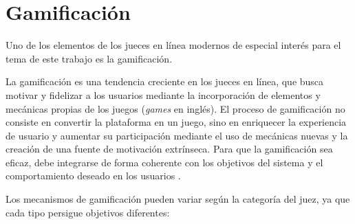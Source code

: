 \section{Gamificación}

Uno de los elementos de los jueces en línea modernos de especial interés para el tema de este trabajo es la gamificación. 

La gamificación es una tendencia creciente en los jueces en línea, que busca motivar y fidelizar a los usuarios mediante la incorporación de elementos y mecánicas propias de los juegos (\textit{games} en inglés). El proceso de gamificación no consiste en convertir la plataforma en un juego, sino en enriquecer la experiencia de usuario y aumentar su participación mediante el uso de mecánicas nuevas y la creación de una fuente de motivación extrínseca.
Para que la gamificación sea eficaz, debe integrarse de forma coherente con los objetivos del sistema y el comportamiento deseado en los usuarios \citep{Zichermann_Cunningham_2011}.

Los mecanismos de gamificación pueden variar según la categoría del juez, ya que cada tipo persigue objetivos diferentes:

